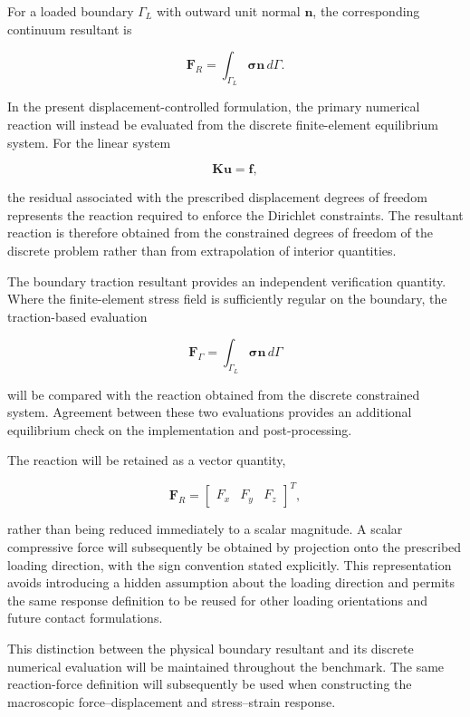 For a loaded boundary $\Gamma_L$ with outward unit normal $\mathbf{n}$, the corresponding continuum resultant is

$$
\mathbf{F}_R
=
\int_{\Gamma_L}
\boldsymbol{\sigma}\mathbf{n}\,d\Gamma.
$$

In the present displacement-controlled formulation, the primary numerical reaction will instead be evaluated from the discrete finite-element equilibrium system. For the linear system

$$
\mathbf{K}\mathbf{u}=\mathbf{f},
$$

the residual associated with the prescribed displacement degrees of freedom represents the reaction required to enforce the Dirichlet constraints. The resultant reaction is therefore obtained from the constrained degrees of freedom of the discrete problem rather than from extrapolation of interior quantities.

The boundary traction resultant provides an independent verification quantity. Where the finite-element stress field is sufficiently regular on the boundary, the traction-based evaluation

$$
\mathbf{F}_{\Gamma}
=
\int_{\Gamma_L}
\boldsymbol{\sigma}\mathbf{n}\,d\Gamma
$$

will be compared with the reaction obtained from the discrete constrained system. Agreement between these two evaluations provides an additional equilibrium check on the implementation and post-processing.

The reaction will be retained as a vector quantity,

$$
\mathbf{F}_R =
\begin{bmatrix}
F_x & F_y & F_z
\end{bmatrix}^{T},
$$

rather than being reduced immediately to a scalar magnitude. A scalar compressive force will subsequently be obtained by projection onto the prescribed loading direction, with the sign convention stated explicitly. This representation avoids introducing a hidden assumption about the loading direction and permits the same response definition to be reused for other loading orientations and future contact formulations.

This distinction between the physical boundary resultant and its discrete numerical evaluation will be maintained throughout the benchmark. The same reaction-force definition will subsequently be used when constructing the macroscopic force--displacement and stress--strain response.


